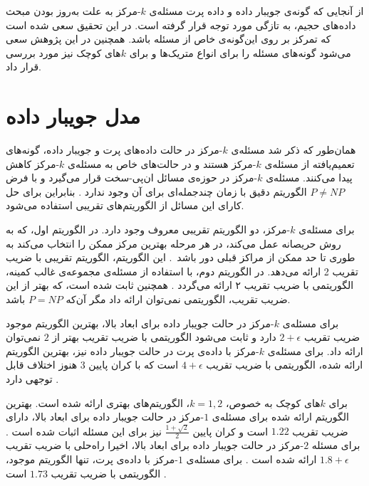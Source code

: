 از آنجایی که گونه‌ی جویبار داده و داده پرت مسئله‌ی $k$-مرکز به علت به‌روز بودن مبحث داده‌های حجیم، به تازگی مورد توجه قرار گرفته است.
در این تحقیق سعی شده است که تمرکز بر روی این‌گونه‌ی خاص از مسئله باشد.
همچنین در این پژوهش سعی می‌شود گونه‌های مسئله را برای انواع متریک‌ها و برای $k$های کوچک نیز مورد بررسی قرار داد.

\section{مدل جویبار داده}

همان‌طور که ذکر شد مسئله‌ی $k$-مرکز در حالت داده‌های پرت و جویبار داده، گونه‌های تعمیم‌یافته از مسئله‌ی $k$-مرکز هستند و در حالت‌های خاص به مسئله‌ی $k$-مرکز کاهش پیدا می‌کنند.
مسئله‌ی $k$-مرکز در حوزه‌ی مسائل ان‌پی-سخت قرار می‌گیرد و با فرض $P \neq NP$ الگوریتم دقیق با زمان چندجمله‌ای برای آن وجود ندارد \cite{michael1979computers}.
بنابراین برای حل کارای این مسائل از الگوریتم‌های تقریبی استفاده می‌شود.

برای مسئله‌ی $k$-مرکز، دو الگوریتم تقریبی معروف وجود دارد.
در الگوریتم اول، که به روش حریصانه عمل می‌کند، در هر مرحله بهترین مرکز ممکن را انتخاب می‌کند به طوری تا حد ممکن از مراکز قبلی دور باشد~\cite{megiddo1984complexity}.
این الگوریتم، الگوریتم تقریبی با ضریب تقریب 2 ارائه می‌دهد.
در الگوریتم دوم، با استفاده از مسئله‌ی مجموعه‌ی غالب کمینه، الگوریتمی با ضریب تقریب ۲ ارائه می‌گردد \cite{vazirani2013approximation}.
همچنین ثابت شده است، که بهتر از این ضریب تقریب، الگوریتمی نمی‌توان ارائه داد مگر آن‌که $P = NP$ باشد.

برای مسئله‌ی $k$-مرکز در حالت جویبار داده برای ابعاد بالا، بهترین الگوریتم موجود ضریب تقریب $2 + \epsilon$ دارد \cite{mccutchen2008streaming, guha2009tight, ahn2014computing} و ثابت می‌شود الگوریتمی با ضریب تقریب بهتر از $2$ نمی‌توان ارائه داد. برای مسئله‌ی $k$-مرکز با داده‌ی پرت در حالت جویبار داده نیز، بهترین الگوریتم ارائه شده، الگوریتمی با ضریب تقریب $4 + \epsilon$ است که با کران پایین $3$ هنوز اختلاف قابل توجهی دارد \cite{charikar2001algorithms}.

برای $k$های کوچک به خصوص، $k =1, 2$، الگوریتم‌های بهتری ارائه شده است. بهترین الگوریتم ارائه شده برای مسئله‌ی $1$-مرکز در حالت جویبار داده برای ابعاد بالا، دارای ضریب تقریب $1.22$ است و کران پایین $\frac{1 + \sqrt{2}}{2}$ نیز برای این مسئله اثبات شده است \cite{agarwal2010streaming, chan2014streaming}. برای مسئله $2$-مرکز در حالت جویبار داده برای ابعاد بالا، اخیرا راه‌حلی با ضریب تقریب $1.8 + \epsilon$ ارائه شده است \cite{kim2014improved}. برای مسئله‌ی $1$-مرکز با داده‌ی پرت، تنها الگوریتم موجود، الگوریتمی با ضریب تقریب $1.73$ است \cite{zarrabi2009streaming}.

